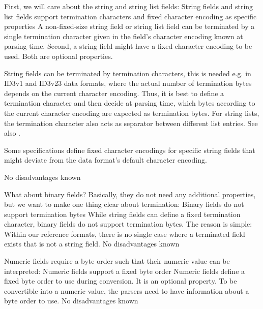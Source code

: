 First, we will care about the string and string list fields:
{%
String fields and string list fields support termination characters and fixed character encoding as specific properties
}
{%
A non-fixed-size string field or string list field can be terminated by a single termination character given in the field's character encoding known at parsing time. Second, a string field might have a fixed character encoding to be used. Both are optional properties.  
}
{%
String fields can be terminated by termination characters, this is needed e.g. in ID3v1 and ID3v23 data formats, where the actual number of termination bytes depends on the current character encoding. Thus, it is best to define a termination character and then decide at parsing time, which bytes according to the current character encoding are expected as termination bytes. For string lists, the termination character also acts as separator between different list entries. See also .

Some specifications define fixed character encodings for specific string fields that might deviate from the data format's default character encoding.
}
{%
No disadvantages known
}

What about binary fields? Basically, they do not need any additional properties, but we want to make one thing clear about termination:
{%
Binary fields do not support termination bytes
}
{%
While string fields can define a fixed termination character, binary fields do not support termination bytes. 
}
{%
The reason is simple: Within our reference formats, there is no single case where a terminated field exists that is not a string field. 
}
{%
No disadvantages known
}

Numeric fields require a byte order such that their numeric value can be interpreted:
{%
Numeric fields support a fixed byte order
}
{%
Numeric fields define a fixed byte order to use during conversion. It is an optional property.
}
{%
To be convertible into a numeric value, the parsers need to have information about a byte order to use.
}
{%
No disadvantages known
}

